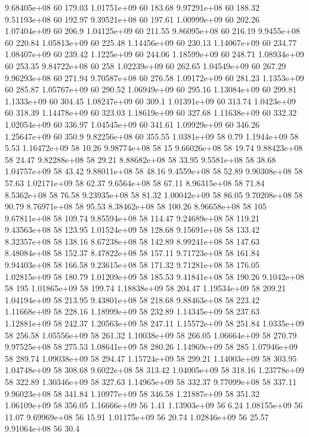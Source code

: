 9.68405e+08 60 179.03
1.01751e+09 60 183.68
9.97291e+08 60 188.32
9.51193e+08 60 192.97
9.39521e+08 60 197.61
1.00999e+09 60 202.26
1.07404e+09 60 206.9
1.04125e+09 60 211.55
9.86095e+08 60 216.19
9.9455e+08 60 220.84
1.05813e+09 60 225.48
1.14456e+09 60 230.13
1.14067e+09 60 234.77
1.08407e+09 60 239.42
1.1225e+09 60 244.06
1.18599e+09 60 248.71
1.08934e+09 60 253.35
9.84722e+08 60 258
1.02239e+09 60 262.65
1.04549e+09 60 267.29
9.96293e+08 60 271.94
9.70587e+08 60 276.58
1.09172e+09 60 281.23
1.1353e+09 60 285.87
1.05767e+09 60 290.52
1.06949e+09 60 295.16
1.13084e+09 60 299.81
1.1333e+09 60 304.45
1.08247e+09 60 309.1
1.01391e+09 60 313.74
1.0423e+09 60 318.39
1.14478e+09 60 323.03
1.18619e+09 60 327.68
1.11638e+09 60 332.32
1.02054e+09 60 336.97
1.04545e+09 60 341.61
1.09929e+09 60 346.26
1.25647e+09 60 350.9
9.82256e+08 60 355.55
1.0381e+09 58 0.79
1.1944e+09 58 5.53
1.16472e+09 58 10.26
9.98774e+08 58 15
9.66026e+08 58 19.74
9.88423e+08 58 24.47
9.82288e+08 58 29.21
8.88682e+08 58 33.95
9.5581e+08 58 38.68
1.04757e+09 58 43.42
9.88011e+08 58 48.16
9.4559e+08 58 52.89
9.90308e+08 58 57.63
1.02171e+09 58 62.37
9.6564e+08 58 67.11
8.96315e+08 58 71.84
8.5362e+08 58 76.58
9.23935e+08 58 81.32
1.00042e+09 58 86.05
9.70208e+08 58 90.79
8.76971e+08 58 95.53
8.38462e+08 58 100.26
8.96658e+08 58 105
9.67811e+08 58 109.74
9.85594e+08 58 114.47
9.24689e+08 58 119.21
9.43563e+08 58 123.95
1.01524e+09 58 128.68
9.15691e+08 58 133.42
8.32357e+08 58 138.16
8.67238e+08 58 142.89
8.99241e+08 58 147.63
8.48084e+08 58 152.37
8.47822e+08 58 157.11
9.71723e+08 58 161.84
9.94403e+08 58 166.58
9.23615e+08 58 171.32
9.71281e+08 58 176.05
1.02815e+09 58 180.79
1.01209e+09 58 185.53
9.41841e+08 58 190.26
9.1042e+08 58 195
1.01865e+09 58 199.74
1.18838e+09 58 204.47
1.19534e+09 58 209.21
1.04194e+09 58 213.95
9.43801e+08 58 218.68
9.88463e+08 58 223.42
1.11668e+09 58 228.16
1.18999e+09 58 232.89
1.14345e+09 58 237.63
1.12881e+09 58 242.37
1.20563e+09 58 247.11
1.15572e+09 58 251.84
1.0335e+09 58 256.58
1.05556e+09 58 261.32
1.10038e+09 58 266.05
1.06664e+09 58 270.79
9.97525e+08 58 275.53
1.08641e+09 58 280.26
1.14969e+09 58 285
1.07946e+09 58 289.74
1.09038e+09 58 294.47
1.15724e+09 58 299.21
1.14003e+09 58 303.95
1.04748e+09 58 308.68
9.6022e+08 58 313.42
1.04005e+09 58 318.16
1.23778e+09 58 322.89
1.30346e+09 58 327.63
1.14965e+09 58 332.37
9.77099e+08 58 337.11
9.96023e+08 58 341.84
1.10977e+09 58 346.58
1.21887e+09 58 351.32
1.06109e+09 58 356.05
1.16666e+09 56 1.41
1.13903e+09 56 6.24
1.08155e+09 56 11.07
9.69969e+08 56 15.91
1.01175e+09 56 20.74
1.02846e+09 56 25.57
9.91064e+08 56 30.4
